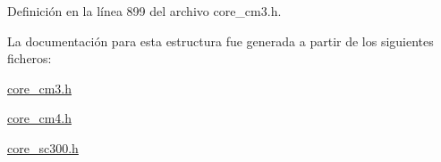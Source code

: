 Definición en la línea 899 del archivo core\+\_\+cm3.\+h.



La documentación para esta estructura fue generada a partir de los siguientes ficheros\+:\begin{DoxyCompactItemize}
\item 
\hyperlink{core__cm3_8h}{core\+\_\+cm3.\+h}\item 
\hyperlink{core__cm4_8h}{core\+\_\+cm4.\+h}\item 
\hyperlink{core__sc300_8h}{core\+\_\+sc300.\+h}\end{DoxyCompactItemize}
